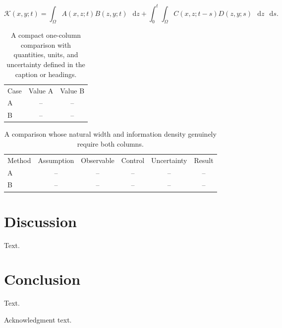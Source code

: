 \documentclass[aps,prl,reprint,superscriptaddress,nofootinbib,longbibliography]{revtex4-2}
\providecommand{\dd}{\mathop{}\!\mathrm{d}}
\theoremstyle{definition}
\theoremstyle{remark}
\begin{document}
\begin{widetext}
\begin{equation}
  \mathcal{K}(x,y;t)
  = \int_{\Omega} A(x,z;t)B(z,y;t)\,\dd z
  + \int_{0}^{t}\!\int_{\Omega} C(x,z;t-s)D(z,y;s)\,\dd z\,\dd s .
  \label{eq:full-width-example}
\end{equation}
\end{widetext}

\begin{table}[b]
  \caption{A compact one-column comparison with quantities, units, and uncertainty
  defined in the caption or headings.\label{tab:single-column}}
  \begin{ruledtabular}
  \begin{tabular}{lcc}
  Case & Value A & Value B \\
  \colrule
  A & -- & -- \\
  B & -- & -- \\
  \end{tabular}
  \end{ruledtabular}
\end{table}

\begin{table}[t]
  \caption{A comparison whose natural width and information density genuinely
  require both columns.\label{tab:two-column}}
  \begin{ruledtabular}
  \begin{tabular*}{\textwidth}{@{\extracolsep{\fill}}lccccc@{}}
  Method & Assumption & Observable & Control & Uncertainty & Result \\
  \colrule
  A & -- & -- & -- & -- & -- \\
  B & -- & -- & -- & -- & -- \\
  \end{tabular*}
  \end{ruledtabular}
\end{table}

\section{Discussion}

Text.

\section{Conclusion}

Text.

\begin{acknowledgments}
Acknowledgment text.
\end{acknowledgments}

\end{document}
